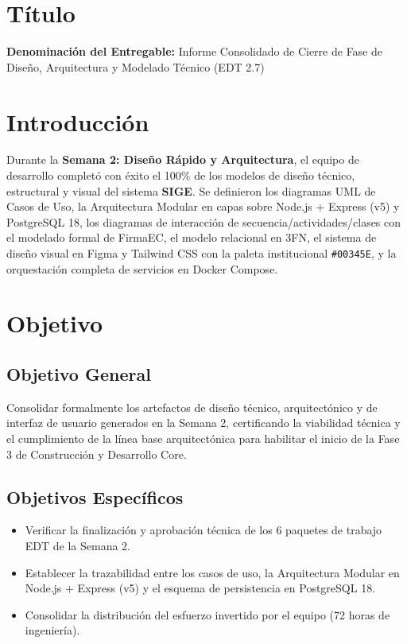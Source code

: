 \documentclass[12pt,a4paper]{article}
\begin{document}
\section{Título}
\textbf{Denominación del Entregable:} Informe Consolidado de Cierre de Fase de Diseño, Arquitectura y Modelado Técnico (EDT 2.7)



\section{Introducción}
Durante la \textbf{Semana 2: Diseño Rápido y Arquitectura}, el equipo de desarrollo completó con éxito el 100\% de los modelos de diseño técnico, estructural y visual del sistema \textbf{SIGE}. Se definieron los diagramas UML de Casos de Uso, la Arquitectura Modular en capas sobre Node.js + Express (v5) y PostgreSQL 18, los diagramas de interacción de secuencia/actividades/clases con el modelado formal de FirmaEC, el modelo relacional en 3FN, el sistema de diseño visual en Figma y Tailwind CSS con la paleta institucional \texttt{\#00345E}, y la orquestación completa de servicios en Docker Compose.

\section{Objetivo}

\subsection{Objetivo General}
Consolidar formalmente los artefactos de diseño técnico, arquitectónico y de interfaz de usuario generados en la Semana 2, certificando la viabilidad técnica y el cumplimiento de la línea base arquitectónica para habilitar el inicio de la Fase 3 de Construcción y Desarrollo Core.

\subsection{Objetivos Específicos}
\begin{itemize}[leftmargin=1.5em, itemsep=1.5pt]
    \item Verificar la finalización y aprobación técnica de los 6 paquetes de trabajo EDT de la Semana 2.
    \item Establecer la trazabilidad entre los casos de uso, la Arquitectura Modular en Node.js + Express (v5) y el esquema de persistencia en PostgreSQL 18.
    \item Consolidar la distribución del esfuerzo invertido por el equipo (72 horas de ingeniería).
\end{itemize}
\end{document}
